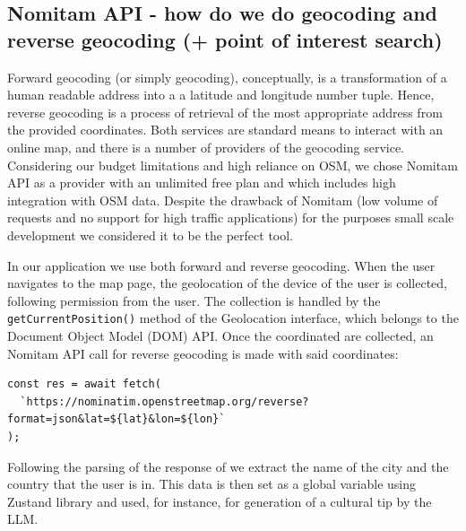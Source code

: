 \subsection{Nomitam API - how do we do geocoding and reverse geocoding (+ point of interest search)}
Forward geocoding (or simply geocoding), conceptually, is a transformation of a human readable address into a a latitude and longitude number tuple. Hence, reverse geocoding is a process of retrieval of the most appropriate address from the provided coordinates. Both services are standard means to interact with an online map, and there is a number of providers of the geocoding service. Considering our budget limitations and high reliance on OSM, we chose Nomitam API as a provider with an unlimited free plan and which includes high integration with OSM data. Despite the drawback of Nomitam (low volume of requests and no support for high traffic applications) for the purposes small scale development we considered it to be the perfect tool. 

In our application we use both forward and reverse geocoding. When the user navigates to the map page, the geolocation of the device of the user is collected, following permission from the user. The collection is handled by the \texttt{getCurrentPosition()} method of the Geolocation interface, which belongs to the Document Object Model (DOM) API. Once the coordinated are collected, an Nomitam API call for reverse geocoding is made with said coordinates:
\begin{verbatim}
const res = await fetch(
  `https://nominatim.openstreetmap.org/reverse?format=json&lat=${lat}&lon=${lon}`
);
\end{verbatim}
Following the parsing of the response of we extract the name of the city and the country that the user is in. This data is then set as a global variable using Zustand library and used, for instance, for generation of a cultural tip by the LLM.

